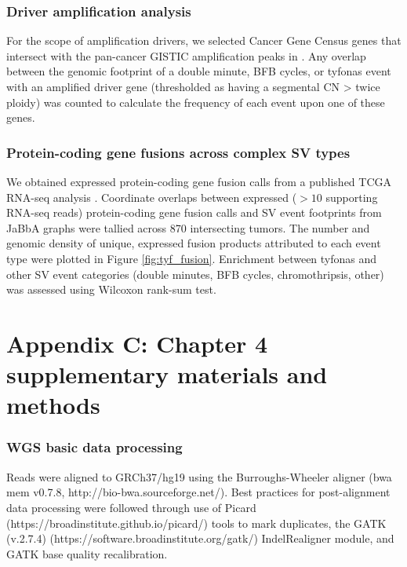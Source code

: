 \documentclass[phd,tocprelim]{cornell}
\begin{document}
\subsection*{Driver amplification analysis}

For the scope of amplification drivers, we selected Cancer Gene Census genes that intersect with the pan-cancer GISTIC amplification peaks in \cite{Zack:2013f1f}. Any overlap between the genomic footprint of a double minute, BFB cycles, or tyfonas event with an amplified driver gene (thresholded as having a segmental CN > twice ploidy) was counted to calculate the frequency of each event upon one of these genes.

\subsection*{Protein-coding gene fusions across complex SV types}
We obtained expressed protein-coding gene fusion calls from a published TCGA RNA-seq analysis \cite{Dehghannasiri2019-hk}.  Coordinate overlaps between expressed ($>10$ supporting RNA-seq reads) protein-coding gene fusion calls and SV event footprints from JaBbA graphs were tallied across 870 intersecting tumors. The number and genomic density of unique, expressed fusion products attributed to each event type were plotted in Figure \ref{fig:tyf_fusion}.  Enrichment between tyfonas and other SV event categories (double minutes, BFB cycles, chromothripsis, other) was assessed using Wilcoxon rank-sum test.


\chapter*{Appendix C: Chapter 4 supplementary materials and methods} \label{app:c}
\subsection*{WGS basic data processing} \label{app:tc_wgs_processing}
Reads were aligned to GRCh37/hg19 using the Burroughs-Wheeler aligner (bwa mem v0.7.8, http://bio-bwa.sourceforge.net/). Best practices for post-alignment data processing were followed through use of Picard (https://broadinstitute.github.io/picard/) tools to mark duplicates, the GATK (v.2.7.4) (https://software.broadinstitute.org/gatk/) IndelRealigner module, and GATK base quality recalibration.
\end{document}
